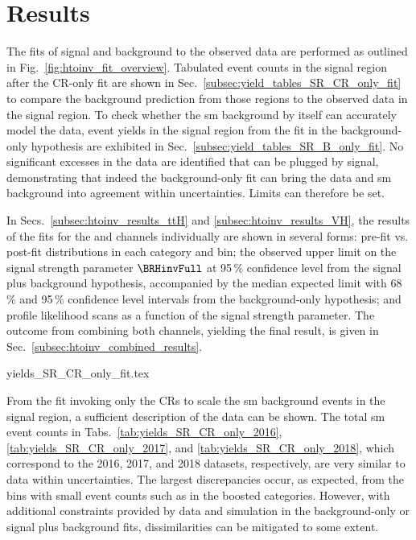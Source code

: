 \section{Results}
\label{sec:htoinv_results}

The fits of signal and background to the observed data are performed as outlined in Fig.~\ref{fig:htoinv_fit_overview}. Tabulated event counts in the signal region after the \gls{CR}-only fit are shown in Sec.~\ref{subsec:yield_tables_SR_CR_only_fit} to compare the background prediction from those regions to the observed data in the signal region. To check whether the \acrshort{sm} background by itself can accurately model the data, event yields in the signal region from the fit in the background-only hypothesis are exhibited in Sec.~\ref{subsec:yield_tables_SR_B_only_fit}. No significant excesses in the data are identified that can be plugged by signal, demonstrating that indeed the background-only fit can bring the data and \acrshort{sm} background into agreement within uncertainties. Limits can therefore be set.

In Secs.~\ref{subsec:htoinv_results_ttH} and \ref{subsec:htoinv_results_VH}, the results of the fits for the \ttH and \VH channels individually are shown in several forms: pre-fit vs. post-fit distributions in each category and \ptmiss bin; the observed upper limit on the signal strength parameter $\BRHinvFull$ at 95\,\% confidence level from the signal plus background hypothesis, accompanied by the median expected limit with 68\,\% and 95\,\% confidence level intervals from the background-only hypothesis; and profile likelihood scans as a function of the signal strength parameter. The outcome from combining both channels, yielding the final result, is given in Sec.~\ref{subsec:htoinv_combined_results}.




{yields_SR_CR_only_fit.tex}

From the fit invoking only the \glspl{CR} to scale the \acrlong{sm} background events in the signal region, a sufficient description of the data can be shown. The total \acrshort{sm} event counts in Tabs.~\ref{tab:yields_SR_CR_only_2016}, \ref{tab:yields_SR_CR_only_2017}, and \ref{tab:yields_SR_CR_only_2018}, which correspond to the 2016, 2017, and 2018 datasets, respectively, are very similar to data within uncertainties. The largest discrepancies occur, as expected, from the bins with small event counts such as in the \ttH boosted categories. However, with additional constraints provided by data and simulation in the background-only or signal plus background fits, dissimilarities can be mitigated to some extent.

